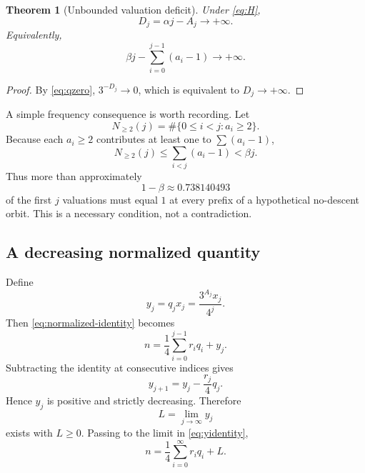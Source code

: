 \documentclass[11pt]{article}
\newtheorem{theorem}{Theorem}[section]
\theoremstyle{definition}
\theoremstyle{remark}
\begin{document}
\begin{theorem}[Unbounded valuation deficit]
Under \eqref{eq:H},
\begin{equation}
\boxed{D_j=\alpha j-A_j\longrightarrow+\infty.}
\label{eq:deficit}
\end{equation}
Equivalently,
\begin{equation}
\boxed{
\beta j-\sum_{i=0}^{j-1}(a_i-1)\longrightarrow+\infty.
}
\label{eq:excess-deficit}
\end{equation}
\end{theorem}

\begin{proof}
By \eqref{eq:qzero}, $3^{-D_j}\to0$, which is equivalent to $D_j\to+\infty$.
\end{proof}

A simple frequency consequence is worth recording.  Let
\[
N_{\ge2}(j)=\#\{0\le i<j:a_i\ge2\}.
\]
Because each $a_i\ge2$ contributes at least one to $\sum(a_i-1)$,
\[
N_{\ge2}(j)
\le
\sum_{i<j}(a_i-1)
<
\beta j.
\]
Thus more than approximately
\[
1-\beta\approx0.738140493
\]
of the first $j$ valuations must equal $1$ at every prefix of a hypothetical no-descent orbit.  This is a necessary condition, not a contradiction.

\subsection{A decreasing normalized quantity}

Define
\begin{equation}
y_j=q_jx_j=\frac{3^{A_j}x_j}{4^j}.
\label{eq:yj}
\end{equation}
Then \eqref{eq:normalized-identity} becomes
\begin{equation}
n=\frac14\sum_{i=0}^{j-1}r_iq_i+y_j.
\label{eq:yidentity}
\end{equation}
Subtracting the identity at consecutive indices gives
\begin{equation}
\boxed{
y_{j+1}=y_j-\frac{r_j}{4}q_j.
}
\label{eq:ydecrease}
\end{equation}
Hence $y_j$ is positive and strictly decreasing.  Therefore
\begin{equation}
L=\lim_{j\to\infty}y_j
\label{eq:L}
\end{equation}
exists with $L\ge0$.  Passing to the limit in \eqref{eq:yidentity},
\begin{equation}
\boxed{
n=\frac14\sum_{i=0}^{\infty}r_iq_i+L.
}
\label{eq:series-L}
\end{equation}
\end{document}
